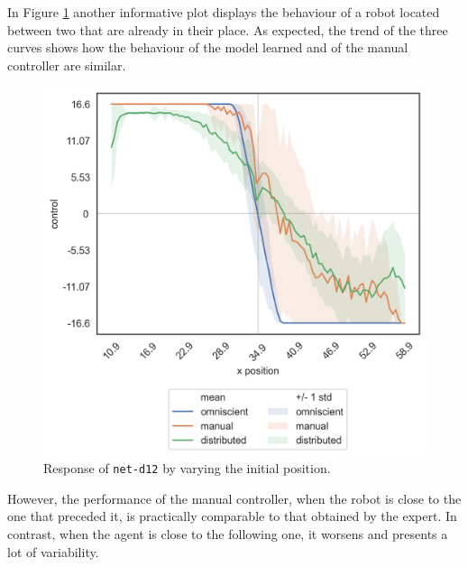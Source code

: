 In Figure \ref{fig:net-d12responseposition} another informative plot displays 
the behaviour of a robot located between two that are already in their place.
As expected, the trend of the three curves shows how the behaviour of the 
model learned and of the manual controller are similar.
\begin{figure}[!htb]
	\centering
	\includegraphics[width=.45\textwidth]{contents/images/net-d12/response-varying_init_position-distributed}%
	\caption{Response of \texttt{net-d12} by varying the initial position.}
	\label{fig:net-d12responseposition}
\end{figure}
However, the performance of the manual controller, when the robot is close to 
the one that preceded it, is practically comparable to that obtained by the 
expert.
In contrast, when the agent is close to the following one, it worsens and 
presents a lot of variability.

